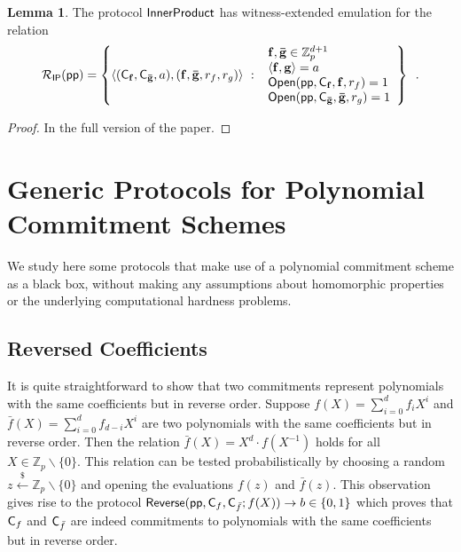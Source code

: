 \documentclass{article}
\theoremstyle{definition}
\newtheorem{lemma}{Lemma}
\begin{document}
\begin{lemma}
    The protocol $\textsf{{InnerProduct}}$ has witness-extended emulation for the relation
\[\mathcal{R}_\mathsf{IP}(\textsf{pp}) = \left\{
    \langle(\mathsf{C}_\mathbf{f}, \mathsf{C}_\mathbf{\bar{g}}, a), (\mathbf{f}, \mathbf{\bar{g}}, r_f, r_g)\rangle \ : \     \begin{array}{l}
            \mathbf{f}, \mathbf{\bar{g}} \in \mathbb{Z}_p^{d+1} \\
            \langle \mathbf{f}, \mathbf{g} \rangle = a \\
            \textsf{{Open}}(\textsf{pp}, \mathsf{C}_\mathbf{f}, \mathbf{f}, r_f) = 1 \\
            \textsf{{Open}}(\textsf{pp}, \mathsf{C}_\mathbf{\bar{g}}, \mathbf{\bar{g}}, r_g) = 1
        \end{array}
    \right\} \enspace .
\]
\end{lemma}

\begin{proof}
In the full version of the paper.
\end{proof}

\section{Generic Protocols for Polynomial Commitment Schemes}

We study here some protocols that make use of a polynomial commitment scheme as a black box, without making any assumptions about homomorphic properties or the underlying computational hardness problems.

\subsection{Reversed Coefficients}

It is quite straightforward to show that two commitments represent polynomials with the same coefficients but in reverse order. Suppose $f(X) = \sum_{i=0}^d f_i X^i$ and $\bar{f}(X) = \sum_{i=0}^d f_{d-i}X^i$ are two polynomials with the same coefficients but in reverse order. Then the relation $\bar{f}(X) = X^d \cdot f(X^{-1})$ holds for all $X \in \mathbb{Z}_p \backslash \{0\}$. This relation can be tested probabilistically by choosing a random $z \xleftarrow{\$} \mathbb{Z}_p \backslash \{0\}$ and opening the evaluations $f(z)$ and $\bar{f}(z)$. This observation gives rise to the protocol $\textsf{{Reverse}}(\textsf{pp}, \mathsf{C}_f, \mathsf{C}_{\bar{f}}; f(X)) \rightarrow b \in \{0,1\}$ which proves that $\mathsf{C}_f$ and $\mathsf{C}_{\bar{f}}$ are indeed commitments to polynomials with the same coefficients but in reverse order.
\end{document}
